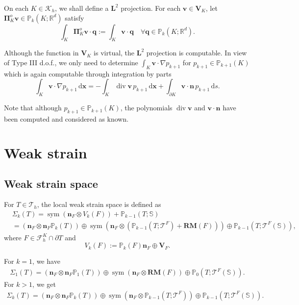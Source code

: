 \documentclass[review,hidelinks,onefignum,onetabnum]{siamart251216}
\newcommand{\sym}{\operatorname{sym}}
\begin{document}
On each \(K\in\mathcal{K}_h\), we shall define a \(\boldsymbol{L}^2\) projection. For each \(\boldsymbol{v} \in \boldsymbol{V}_K\), let \(\boldsymbol{\Pi}_K^o \boldsymbol{v} \in \mathbb{P}_k(K;\mathbb{R}^d)\) satisfy
\[
\int_K \boldsymbol{\Pi}_K^o \boldsymbol{v} \cdot \boldsymbol{q} := \int_K \boldsymbol{v} \cdot \boldsymbol{q} \quad \forall \boldsymbol{q} \in \mathbb{P}_k(K;\mathbb{R}^d).
\]

Although the function in \(\boldsymbol{V}_K\) is virtual, the \(\boldsymbol{L}^2\) projection is computable. In view of Type III d.o.f., we only need to determine \(\int_K \boldsymbol{v} \cdot \nabla p_{k+1}\) for \(p_{k+1} \in \mathbb{P}_{k+1}(K)\) which is again computable through integration by parts
\[
\int_K \boldsymbol{v} \cdot \nabla p_{k+1} \, \mathrm{d}\boldsymbol{x} = - \int_K \operatorname{div} \boldsymbol{v} \, p_{k+1} \, \mathrm{d}\boldsymbol{x} + \int_{\partial K} \boldsymbol{v} \cdot \boldsymbol{n} \, p_{k+1} \, \mathrm{d}s.
\]

Note that although \(p_{k+1} \in \mathbb{P}_{k+1}(K)\), the polynomials \(\operatorname{div} \boldsymbol{v}\) and \(\boldsymbol{v} \cdot \boldsymbol{n}\) have been computed and considered as known.



\section{Weak strain}

\subsection{Weak strain space}
For $T\in\mathcal{T}_h$, the local weak strain space is defined as
\begin{align*}
&\Sigma_k(T)= \sym(\boldsymbol{n}_F\otimes V_{k}(F)) + \mathbb{P}_{k-1}(T;\mathbb S)\\
&= (\boldsymbol{n}_F\otimes\boldsymbol{n}_F\mathbb{P}_k(T)) \oplus \sym(\boldsymbol{n}_F\otimes (\mathbb{P}_{k-1}(T;\mathscr T^F) + \mathbf{RM}(F)))\oplus \mathbb{P}_{k-1}(T;\mathscr T^F(\mathbb S)),
\end{align*}
where $F\in\mathcal{F}_h^{K}\cap \partial T$ and
$$V_{k}(F) := \mathbb{P}_k(F) \boldsymbol{n}_F \oplus \boldsymbol{V}_F.$$

For $k=1$, we have
\begin{align*}
\Sigma_1(T)= (\boldsymbol{n}_F\otimes\boldsymbol{n}_F\mathbb{P}_1(T)) \oplus \sym(\boldsymbol{n}_F\otimes \mathbf{RM}(F))\oplus \mathbb{P}_{0}(T;\mathscr T^F(\mathbb S)).
\end{align*}
For $k>1$, we get
\begin{align*}
\Sigma_k(T)= (\boldsymbol{n}_F\otimes\boldsymbol{n}_F\mathbb{P}_k(T)) \oplus \sym(\boldsymbol{n}_F\otimes \mathbb{P}_{k-1}(T;\mathscr T^F))\oplus \mathbb{P}_{k-1}(T;\mathscr T^F(\mathbb S)).
\end{align*}
\end{document}
